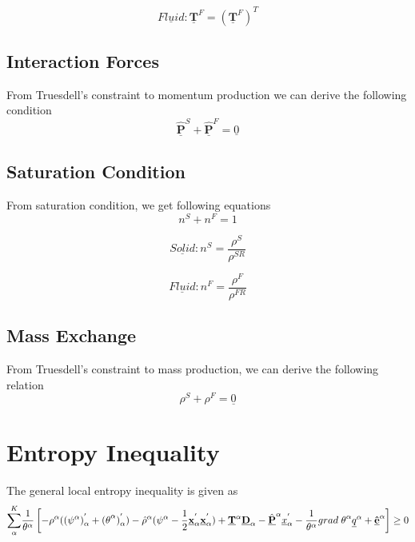 \documentclass[12pt]{article}
\begin{document}
\begin{equation}
	{\underline{Fluid}}      : {\underline{\mathbf{T}}}^{F} = ({\underline{\mathbf{T}}}^{F})^T
\end{equation}

\subsection{Interaction Forces}
From Truesdell’s constraint to momentum production we can derive the following condition
\begin{equation}
	{\underline{\mathbf{\hat{P}}}^{S}} + \underline{\mathbf{\hat{P}}}^{F} = \underline{0}
\end{equation}
\subsection{Saturation Condition}
From saturation condition, we get following equations
\begin{equation}
	{n}^{S} + {n}^{F} = 1
\end{equation}


\begin{equation}
	{\underline{Solid}}      :  {n}^{S} = \frac{{\rho}^{S}}{{\rho}^{SR}}
\end{equation}

\begin{equation}
	{\underline{Fluid}}      : {n}^{F} = \frac{{\rho}^{F}}{{\rho}^{FR}}
\end{equation}
\subsection{Mass Exchange}
From Truesdell’s constraint to mass production, we can derive the following relation
\begin{equation}
	{\rho}^{S} + {\rho}^{F} = \underline{0}
\end{equation}


\section{Entropy Inequality}
The general local entropy inequality is given as
\begin{equation*}
	{{\sum_{\alpha}^{{K}}}{\frac{1}{\theta^\alpha}}} \left[ {-\rho^\alpha}{((\psi^\alpha)_{\alpha}^{'}+{(\theta}^\alpha)_{\alpha}^{'})} - {\hat{\rho}^{\alpha}}({{\psi}^{\alpha} - {\frac{1}{2}}{\underline{\mathbf{x}}_{\alpha}^{'}}{\underline{\mathbf{x}}_{\alpha}^{'}}}) + {{\underline{\mathbf{T}}}^{\alpha}}{{\underline{\mathbf{D}}}_{\alpha}} - {{\underline{\hat{\mathbf{P}}}}^{\alpha}}{\underline{x}_{\alpha}^{'}} -  {\frac{1}{\theta^\alpha}{{grad\hspace{1mm}\theta}^{\alpha}{\underline{q}^\alpha}}} + {\mathbf{\hat{\underline{e}}}^{\alpha}}                        \right] \geq 0
\end{equation*}
\end{document}
